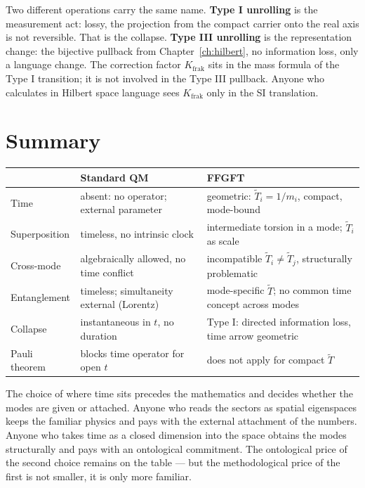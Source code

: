 Two different operations carry the same name. \textbf{Type I
unrolling} is the measurement act: lossy, the projection from the
compact carrier onto the real axis is not reversible. That is the
collapse. \textbf{Type III unrolling} is the representation change: the
bijective pullback from Chapter~\ref{ch:hilbert}, no information loss,
only a language change. The correction factor $K_{\mathrm{frak}}$ sits in the
mass formula of the Type I transition; it is not involved in the Type III pullback. Anyone who calculates in Hilbert space language sees $K_{\mathrm{frak}}$
only in the SI translation.

\section{Summary}

\begin{center}
\small\renewcommand{\arraystretch}{1.3}
\begin{tabular}{p{2.2cm}p{3.5cm}p{3.7cm}}
\toprule
 & \textbf{Standard QM} & \textbf{FFGFT} \\
\midrule
Time & absent: no operator; external parameter & geometric: $\tilde T_i = 1/m_i$, compact, mode-bound \\
Superposition & timeless, no intrinsic clock & intermediate torsion in a mode; $\tilde T_i$ as scale \\
Cross-mode & algebraically allowed, no time conflict & incompatible $\tilde T_i\neq\tilde T_j$, structurally problematic \\
Entanglement & timeless; simultaneity external (Lorentz) & mode-specific $\tilde T$; no common time concept across modes \\
Collapse & instantaneous in $t$, no duration & Type I: directed information loss, time arrow geometric \\
Pauli theorem & blocks time operator for open $t$ & does not apply for compact $\tilde T$ \\
\bottomrule
\end{tabular}
\end{center}

The choice of where time sits precedes the mathematics and decides
whether the modes are given or attached. Anyone who reads the sectors as
spatial eigenspaces keeps the familiar physics and pays with
the external attachment of the numbers. Anyone who takes time as a closed
dimension into the space obtains the modes structurally and pays with
an ontological commitment. The ontological price of the second choice
remains on the table --- but the methodological price of the first is not
smaller, it is only more familiar.

